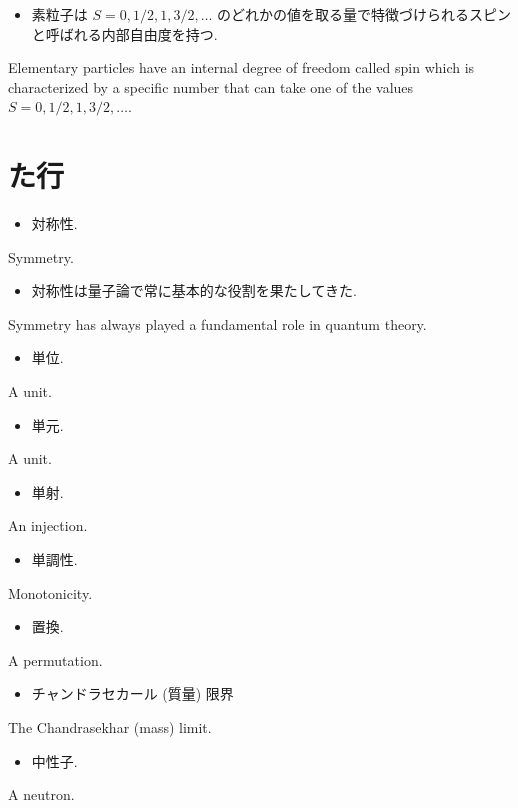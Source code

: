 \documentclass[openany, a4paper, oneside]{jsbook}
\begin{document}
\begin{itemize}
\item 素粒子は $S = 0, 1/2, 1, 3/2, \dots$ のどれかの値を取る量で特徴づけられるスピンと呼ばれる内部自由度を持つ. \cite{LiebSeiringer1}
\end{itemize}
Elementary particles have an internal degree of freedom called spin which is characterized
by a specific number that can take one of the values $S = 0, 1/2, 1, 3/2, \dots$.
\section{た行}

\begin{itemize}
\item 対称性.
\end{itemize}
Symmetry.

\begin{itemize}
\item 対称性は量子論で常に基本的な役割を果たしてきた. \cite{VSVaradarajan1}
\end{itemize}
Symmetry has always played a fundamental role in quantum theory.

\begin{itemize}
\item 単位.
\end{itemize}
A unit.

\begin{itemize}
\item 単元.
\end{itemize}
A unit.

\begin{itemize}
\item 単射.
\end{itemize}
An injection.

\begin{itemize}
\item 単調性.
\end{itemize}
Monotonicity.

\begin{itemize}
\item 置換.
\end{itemize}
A permutation.

\begin{itemize}
\item チャンドラセカール (質量) 限界 \cite{LiebSeiringer1}
\end{itemize}
The Chandrasekhar (mass) limit.

\begin{itemize}
\item 中性子. \cite{LiebSeiringer1}
\end{itemize}
A neutron.
\end{document}

